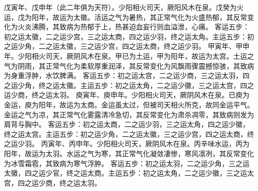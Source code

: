 \documentclass[12pt,UTF8]{ctexbook}
\begin{document}
戊寅年、戊申年（此二年俱为天符）。少阳相火司天，厥阳风木在泉。戊癸为火运，戊为阳年，故运为太徽。活运之气为暑热，其正常气化为火盛热郁，其反常变化为火炎沸腾，其致病为热郁于上，热甚迫血妄行则血溢泄，心痛。
客运五步：初之运太徽，二之运少宫，三之运太商，四之运少羽，终之运太角。主运五步：初之运少角，二之运太徽，三之运少宫，四之运太商，终之运少羽。
甲寅年、甲申年。少阳相火司天，厥阴风木在泉。甲已为土运，甲为阳年，故运为太宫。土运之气为阴雨，其正常气化为柔软厚重润泽，其反常变化为风飘雨骤震撼惊骇，其致病为身重浮肿，水饮脾满。
客运五步：初之运太宫，二之运少商，三之运太羽，四之运少角，终之运太徽。主运五步：初之运太角，二之运少徽，三之运太宫，四之运少商，终之运太羽。
庾寅年、庾申年。少阳相火司天，厥阴风木在泉。已庾为金运，庾为阳年，故运为太商。金运虽太过，但被司天相火所克，故同金运平气。金运之气为凉，其正常气化雾露清冷急切，其反常变化为肃杀凋零，其致病则发为肩背与胸中。
客运五步：初之运太商，二之运少羽，三之运太角，四之运少徽，终之运太宫。主运五步：初之运少角，二之运太徽，三之运少宫，四之运太商，终之运少羽。
丙寅年、丙申年。少阳相火司天，厥阴风木在泉。丙辛味水运，丙为阳年，故运为太羽。水运之气为寒，其正常气化凝敛凄惨，寒风凛冽，其反常变化为冰雪霜雹，其致病为寒气浮肿。
客运五步：初之运太羽，二之运少角，三之运太徽，四之运少官，终之运太商。主运五步：初之运太角，二之运少徽，三之运太宫，四之运少商，终之运太羽。
\end{document}
